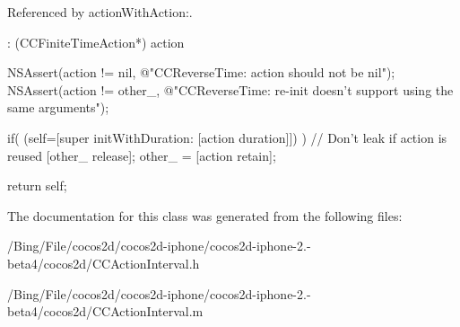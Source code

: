 Referenced by action\-With\-Action\-:.


\begin{DoxyCode}
                    : (CCFiniteTimeAction*) action
{
        NSAssert(action != nil, @"CCReverseTime: action should not be nil");
        NSAssert(action != other_, @"CCReverseTime: re-init doesn't support
       using the same arguments");

        if( (self=[super initWithDuration: [action duration]]) ) {
                // Don't leak if action is reused
                [other_ release];
                other_ = [action retain];
        }

        return self;
}
\end{DoxyCode}


The documentation for this class was generated from the following files\-:\begin{DoxyCompactItemize}
\item 
/\-Bing/\-File/cocos2d/cocos2d-\/iphone/cocos2d-\/iphone-\/2.-\/beta4/cocos2d/C\-C\-Action\-Interval.\-h\item 
/\-Bing/\-File/cocos2d/cocos2d-\/iphone/cocos2d-\/iphone-\/2.-\/beta4/cocos2d/C\-C\-Action\-Interval.\-m\end{DoxyCompactItemize}
